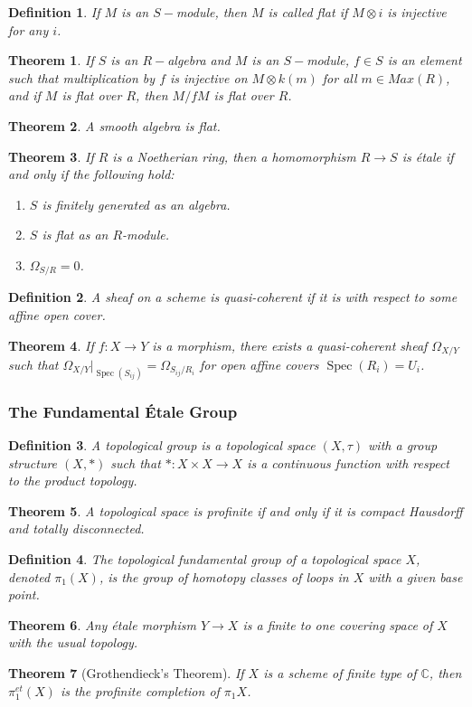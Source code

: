 \documentclass[oneside]{book}
\theoremstyle{mystyle}
\newtheorem{theorem}{Theorem}[section]
\newtheorem{definition}{Definition}[section]
\DeclareMathOperator{\Spec}{Spec}
\begin{document}
\begin{definition}
If $M$ is an $S-$module, then $M$ is called flat if $M\otimes i$ is injective for any $i$.
\end{definition}
\begin{theorem}
If $S$ is an $R-$algebra and $M$ is an $S-$module, $f\in S$ is an element such that multiplication by $f$ is injective on $M\otimes k(m)$ for all $m \in Max(R)$, and if $M$ is flat over $R$, then $M/fM$ is flat over $R$.
\end{theorem}
\begin{theorem}
A smooth algebra is flat.
\end{theorem}
\begin{theorem}
If $R$ is a Noetherian ring, then a homomorphism $R\rightarrow S$ is \'{e}tale if and only if the following hold:
\begin{enumerate}
    \item $S$ is finitely generated as an algebra.
    \item $S$ is flat as an $R$-module.
    \item $\Omega_{S/R} = 0$.
\end{enumerate}
\end{theorem}
\begin{definition}
A sheaf on a scheme is quasi-coherent if it is with respect to some affine open cover.
\end{definition}
\begin{theorem}
If $f:X\rightarrow Y$ is a morphism, there exists a quasi-coherent sheaf $\Omega_{X/Y}$ such that $\Omega_{X/Y}\big|_{\Spec(S_{ij})} = \Omega_{S_{ij}/R_i}$ for open affine covers $\Spec(R_i) = U_i$.
\end{theorem}
\subsubsection{The Fundamental \'{E}tale Group}
\begin{definition}
A topological group is a topological space $(X,\tau)$ with a group structure $(X,*)$ such that $*:X\times X\rightarrow X$ is a continuous function with respect to the product topology.
\end{definition}
\begin{theorem}
A topological space is profinite if and only if it is compact Hausdorff and totally disconnected.
\end{theorem}
\begin{definition}
The topological fundamental group of a topological space $X$, denoted $\pi_1(X)$, is the group of homotopy classes of loops in $X$ with a given base point.
\end{definition}
\begin{theorem}
Any \'{e}tale morphism $Y\rightarrow X$ is a finite to one covering space of $X$ with the usual topology.
\end{theorem}
\begin{theorem}[Grothendieck's Theorem]
If $X$ is a scheme of finite type of $\mathbb{C}$, then $\pi_{1}^{et}(X)$ is the profinite completion of $\pi_1{X}$.
\end{theorem}
\end{document}
